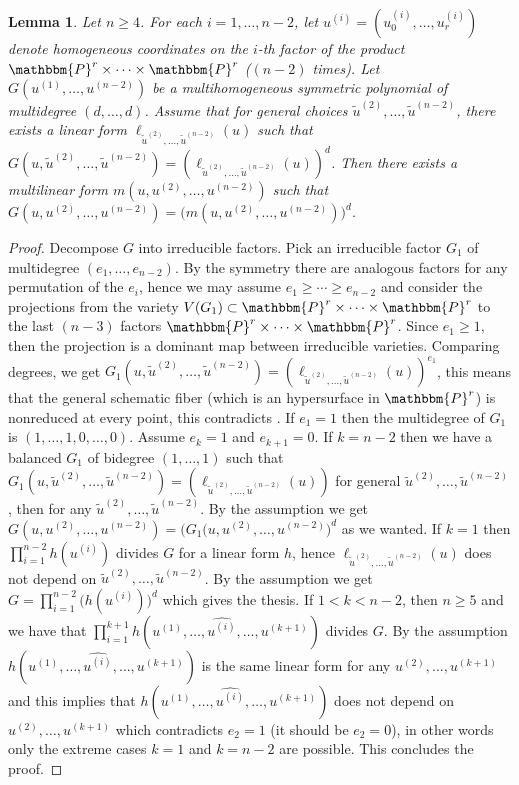 \documentclass[aps,floatfix,groupedaddress,superscriptaddress,longbibliography,footinbib,notitlepage,showpacs]{revtex4-1}
\newtheorem{lemma}[theorem]{Lemma}
\begin{document}
\begin{lemma}\label{lem:multd}
Let $n \geq 4$. For each $i=1,\ldots,n-2$, let $u^{(i)}=(u^{(i)}_0,\ldots,u^{(i)}_r)$ denote homogeneous coordinates on the $i$-th factor of the product $\mathbbm{P}^r\times\cdots\times\mathbbm{P}^r$ ($(n-2)$ times). Let $G(u^{(1)},\ldots,u^{(n-2)})$ be a multihomogeneous symmetric polynomial of multidegree $(d,\ldots,d)$. Assume that for general choices $\tilde u^{(2)},\ldots,\tilde u^{(n-2)}$, there exists a linear form $\ell_{\tilde u^{(2)},\ldots,\tilde u^{(n-2)}}(u)$ such that $G(u,\tilde u^{(2)},\ldots,\tilde u^{(n-2)})
=(\ell_{\tilde u^{(2)},\ldots,\tilde u^{(n-2)}}(u))^d$. Then there exists a multilinear form $m(u,u^{(2)},\ldots,u^{(n-2)})$ such that $G(u,u^{(2)},\ldots,u^{(n-2)})
= \big(m(u,u^{(2)},\ldots,u^{(n-2)})\big)^d$.
\end{lemma}
\begin{proof}
Decompose $G$ into irreducible factors. Pick an irreducible factor $G_1$ of multidegree $(e_1,\ldots, e_{n-2})$. By the symmetry there are analogous factors for any permutation  of the $e_i$, hence we may assume $e_1\geq\cdots\geq e_{n-2}$ and consider the projections from the variety $V(G_1)\subset\mathbbm{P}^r\times\cdots\times\mathbbm{P}^r$ to the last $(n-3)$ factors $\mathbbm{P}^r\times\cdots\times\mathbbm{P}^r$.
Since $e_1\ge 1$, then the projection is a dominant map between irreducible varieties. Comparing degrees, we get $G_1(u,\tilde u^{(2)},\ldots,\tilde u^{(n-2)})=(\ell_{\tilde u^{(2)},\ldots,\tilde u^{(n-2)}}(u))^{e_1}$, this means that the general schematic fiber (which is an hypersurface in $\mathbbm{P}^r$) is nonreduced at every point, this contradicts \cite[Lemma III.10.5]{Hart}. If $e_1=1$ then the multidegree of $G_1$ is $(1,\ldots, 1,0,\ldots, 0)$. Assume $e_{k}=1$ and $e_{k+1}=0$. If $k=n-2$ then we have a balanced $G_1$ of bidegree $(1,\ldots, 1)$ such that  $G_1(u,\tilde u^{(2)},\ldots ,\tilde u^{(n-2)})=(\ell_{\tilde u^{(2)},\ldots, \tilde u^{(n-2)}}(u))$
for general  $\tilde u^{(2)},\ldots ,\tilde u^{(n-2)}$, then for any $\tilde u^{(2)},\ldots, \tilde u^{(n-2)}$.  
By the assumption we get $G(u,u^{(2)},\ldots, u^{(n-2)})=\big(G_1(u,u^{(2)},\ldots, u^{(n-2)}\big)^d$ as we wanted.
If $k=1$ then $\prod_{i=1}^{n-2} h(u^{(i)})$ divides $G$
for a linear form $h$, hence $\ell_{\tilde u^{(2)},\ldots, \tilde u^{(n-2)}}(u)$ does not depend on ${\tilde u^{(2)},\ldots, \tilde u^{(n-2)}}$. By the assumption we get $G=\prod_{i=1}^{n-2} \big(h(u^{(i)})\big)^d$ which gives the thesis. If $1<k<n-2$, then $n\geq 5$ and we have that $\prod_{i=1}^{k+1}h(u^{(1)},\ldots,\widehat{u^{(i)}},\ldots,u^{(k+1)})$ divides $G$. By the assumption $h(u^{(1)},\ldots,\widehat{u^{(i)}},\ldots, u^{(k+1)})$ is the same linear form for any $ u^{(2)},\ldots, u^{(k+1)}$ and this implies that $h(u^{(1)},\ldots,\widehat{u^{(i)}},\ldots, u^{(k+1)})$ does not depend on $u^{(2)},\ldots,u^{(k+1)}$ which contradicts $e_2=1$ (it should be $e_2=0$), in other words only the extreme cases $k=1$ and $k=n-2$ are possible. This concludes the proof.
\end{proof}
\end{document}
